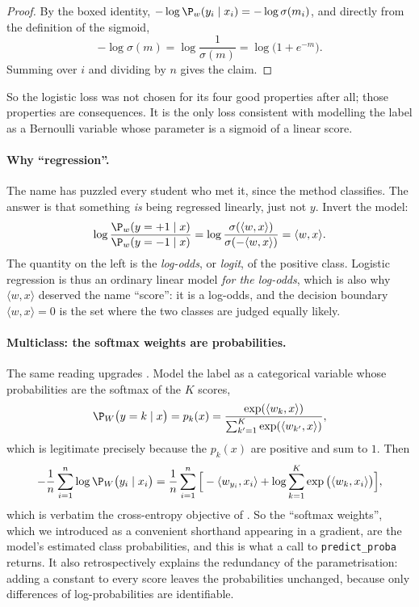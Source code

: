 \begin{proof}
By the boxed identity, $-\log \P_w(y_i \mid x_i) = -\log\sigma(m_i)$, and directly from
the definition of the sigmoid,
\[
- \log \sigma(m) = \log \frac{1}{\sigma(m)} = \log\big( 1 + e^{-m} \big) .
\]
Summing over $i$ and dividing by $n$ gives the claim.
\end{proof}

So the logistic loss was not chosen for its four good properties after all; those
properties are consequences. It is the only loss consistent with modelling the label as
a Bernoulli variable whose parameter is a sigmoid of a linear score.

\paragraph{Why ``regression''.}
The name has puzzled every student who met it, since the method classifies. The answer
is that something \emph{is} being regressed linearly, just not $y$. Invert the model:
\[
\log \frac{\P_w(y = +1 \mid x)}{\P_w(y = -1 \mid x)}
= \log \frac{\sigma(\langle w, x\rangle)}{\sigma(-\langle w, x\rangle)}
= \langle w, x \rangle .
\]
The quantity on the left is the \emph{log-odds}, or \emph{logit}, of the positive class.
Logistic regression is thus an ordinary linear model \emph{for the log-odds}, which is
also why $\langle w, x\rangle$ deserved the name ``score'': it is a log-odds, and the
decision boundary $\langle w, x\rangle = 0$ is the set where the two classes are judged
equally likely.

\paragraph{Multiclass: the softmax weights are probabilities.}
The same reading upgrades . Model the label as a categorical
variable whose probabilities are the softmax of the $K$ scores,
\[
\P_W\big( y = k \mid x \big) = p_k(x)
= \frac{\exp(\langle w_k, x\rangle)}{\sum_{k'=1}^K \exp(\langle w_{k'}, x\rangle)} ,
\]
which is legitimate precisely because the $p_k(x)$ are positive and sum to $1$. Then
\[
- \frac1n \sum_{i=1}^n \log \P_W\big( y_i \mid x_i \big)
= \frac1n \sum_{i=1}^n \Big[ - \langle w_{y_i}, x_i\rangle + \log \sum_{k=1}^K \exp\big( \langle w_k, x_i \rangle \big) \Big] ,
\]
which is verbatim the cross-entropy objective of . So the
``softmax weights'', which we introduced as a convenient shorthand appearing in a
gradient, are the model's estimated class probabilities, and this is what a call to
\texttt{predict\_proba} returns. It also retrospectively explains the redundancy of the
parametrisation: adding a constant to every score leaves the probabilities unchanged,
because only differences of log-probabilities are identifiable.

